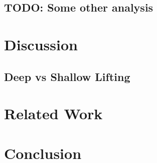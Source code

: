 \documentclass[11pt]{article} %
\begin{document}
\subsection{TODO: Some other analysis}

\section{Discussion}
\subsection{Deep vs Shallow Lifting}

\section{Related Work}

\section{Conclusion}

 

\end{document}
